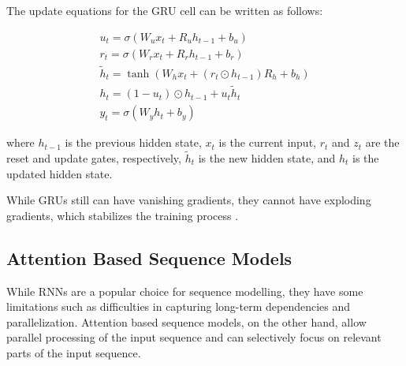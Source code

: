 The update equations for the GRU cell can be written as follows:

\begin{align}
    u_t = \sigma(W_u x_t + R_u h_{t-1} + b_u)\\
    r_t = \sigma(W_r x_t + R_r h_{t-1} + b_r)\\
    \tilde{h}_t = \tanh(W_h x_t + (r_t \odot h_{t-1})R_h + b_h)\\
    h_t = (1 - u_t) \odot h_{t-1} + u_t \tilde{h}_t\\
    y_t = \sigma(W_y h_t + b_y)
\end{align}



where $h_{t-1}$ is the previous hidden state, $x_t$ is the current input, $r_t$ and $z_t$ are the reset and update gates, respectively, $\tilde{h}_t$ is the new hidden state, and $h_t$ is the updated hidden state.

While GRUs still can have vanishing gradients, they cannot have exploding gradients, which stabilizes the training process \cite{cahuantzi2023comparison}.


\subsection{Attention Based Sequence Models}

While RNNs are a popular choice for sequence modelling, they have some limitations such as difficulties in capturing long-term dependencies and parallelization.
Attention based sequence models, on the other hand, allow parallel processing of the input sequence and can selectively focus on relevant parts of the 
input sequence. \\

